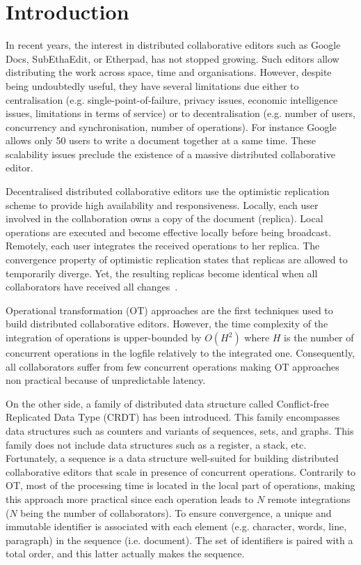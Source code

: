 
\section{Introduction}

In recent years, the interest in distributed collaborative editors such as
Google Docs, SubEthaEdit, or Etherpad, has not stopped growing. Such editors
allow distributing the work across space, time and organisations. However,
despite being undoubtedly useful, they have several limitations due either to
centralisation (e.g. single-point-of-failure, privacy issues, economic
intelligence issues, limitations in terms of service) or to decentralisation
(e.g. number of users, concurrency and synchronisation, number of
operations). For instance Google~\cite{nichols1995high} allows only 50 users to
write a document together at a same time. These scalability issues preclude the
existence of a massive distributed collaborative editor.

Decentralised distributed collaborative editors use the optimistic replication
scheme \cite{johnson1975maintenance, saito2005optimistic} to provide high
availability and responsiveness. Locally, each user involved in the
collaboration owns a copy of the document (replica). Local operations are
executed and become effective locally before being broadcast. Remotely, each
user integrates the received operations to her replica. The convergence
property of optimistic replication states that replicas are allowed to
temporarily diverge. Yet, the resulting replicas become identical when all
collaborators have received all changes~\cite{demers1987epidemic}.

Operational transformation (OT) approaches are the first techniques used to
build distributed collaborative editors. However, the time complexity of the
integration of operations is upper-bounded by $O(H^2)$ where $H$ is the number
of concurrent operations in the logfile relatively to the integrated
one. Consequently, all collaborators suffer from few concurrent operations
making OT approaches non practical because of unpredictable latency.

On the other side, a family of distributed data structure called Conflict-free
Replicated Data Type \cite{shapiro2011comprehensive,shapiro2011conflict} (CRDT)
has been introduced. This family encompasses data structures such as counters
and variants of sequences, sets, and graphs. This family does not include data
structures such as a register, a stack, etc. Fortunately, a sequence is a data
structure well-suited for building distributed collaborative editors that scale
in presence of concurrent operations. Contrarily to OT, most of the processing
time is located in the local part of operations, making this approach more
practical since each operation leads to $N$ remote integrations ($N$ being the
number of collaborators). To ensure convergence, a unique and immutable
identifier is associated with each element (e.g. character, words, line,
paragraph) in the sequence (i.e. document). The set of identifiers is paired
with a total order, and this latter actually makes the sequence.


